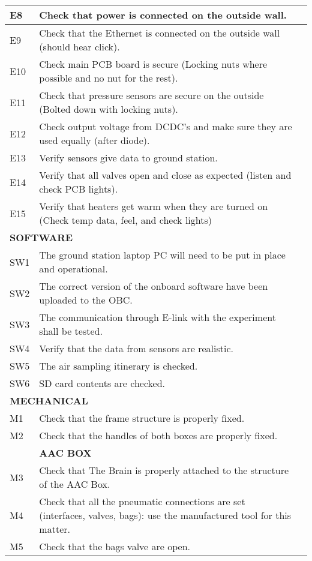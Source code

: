 \begin{longtable} {|m{}|m{}|m{}|}
E8 & Check that power is connected on the outside wall. & \\ \hline
E9 & Check that the Ethernet is connected on the outside wall (should hear click). & \\ \hline
E10 & Check main PCB board is secure (Locking nuts where possible and no nut for the rest).\\ \hline
E11 & Check that pressure sensors are secure on the outside (Bolted down with locking nuts). & \\ \hline
E12 & Check output voltage from DCDC's and make sure they are used equally (after diode). & \\ \hline
E13 & Verify sensors give data to ground station. & \\ \hline
E14 & Verify that all valves open and close as expected (listen and check PCB lights).& \\ \hline
E15 & Verify that heaters get warm when they are turned on (Check temp data, feel, and check lights)& \\ \hline
\multicolumn{2}{|l|}{  \textbf{SOFTWARE} } & \\ \hline
SW1 & The ground station laptop PC will need to be put in place and operational. & \\ \hline
SW2 & The correct version of the onboard software have been uploaded to the OBC. & \\ \hline
SW3 & The communication through E-link with the experiment shall be tested. & \\ \hline
SW4 & Verify that the data from sensors are  realistic. & \\ \hline
SW5 & The air sampling itinerary is checked. & \\ \hline
SW6 & SD card contents are checked. & \\ \hline
\multicolumn{2}{|l|}{ \textbf{MECHANICAL} } & \\
\hline
M1 & Check that the frame structure is properly fixed. & \\
\hline
M2 & Check that the handles of both boxes are properly fixed. & \\
\hline
& \textbf{AAC BOX} & \\
\hline
M3 & Check that The Brain is properly attached to the structure of the AAC Box. & \\
\hline
M4 & Check that all the pneumatic connections are set (interfaces, valves, bags): use the manufactured tool for this matter. & \\
\hline
M5 & Check that the bags valve are open. & \\

\end{longtable}
